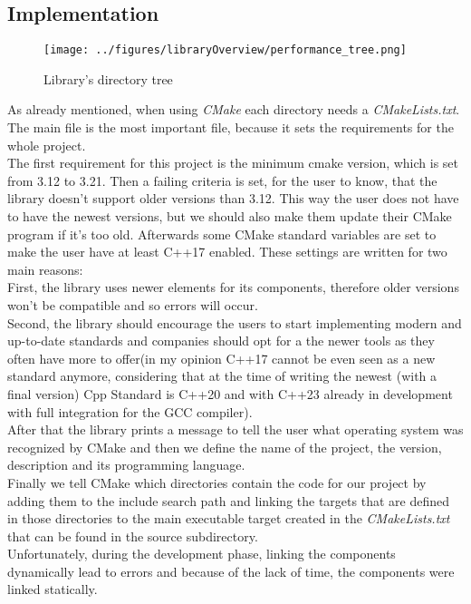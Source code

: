 \subsection{Implementation}
\begin{wrapfigure}{1}{0.5\textwidth}
	\texttt{[image: ../figures/libraryOverview/performance\_tree.png]}
	\caption{Library's directory tree}
	\label{directory_tree}
\end{wrapfigure}
As already mentioned, when using \textit{CMake} each directory needs a \textit{CMakeLists.txt}. The main file is the most important file, because it sets the requirements for the whole project.\\
The first requirement for this project is the minimum cmake version, which is set from 3.12 to 3.21. Then a failing criteria is set, for the user to know, that the library doesn't support older versions than 3.12. This way the user does not have to have the newest versions, but we should also make them update their CMake program if it's too old. Afterwards some CMake standard variables are set to make the user have at least C++17 enabled. These settings are written for two main reasons: \\
First, the library uses newer elements for its components, therefore older versions won't be compatible and so errors will occur.\\
Second, the library should encourage the users to start implementing modern and up-to-date standards and companies should opt for a the newer tools as they often have more to offer(in my opinion C++17 cannot be even seen as a new standard anymore, considering that at the time of writing the newest (with a final version) Cpp Standard is C++20 and with C++23 already in development with full integration for the GCC compiler).\\
After that the library prints a message to tell the user what operating system was recognized by CMake and then we define the name of the project, the version, description and its programming language.\\
Finally we tell CMake which directories contain the code for our project by adding them to the include search path and linking the targets that are defined in those directories to the main executable target created in the \textit{CMakeLists.txt} that can be found in the source subdirectory.\\ 
Unfortunately, during the development phase, linking the components dynamically lead to errors and because of the lack of time, the components were linked statically.\\
